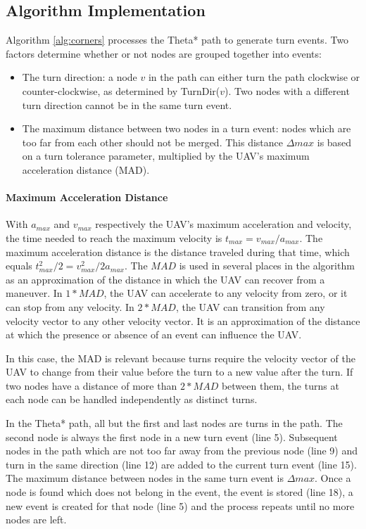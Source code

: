 \subsection{Algorithm Implementation}
Algorithm \ref{alg:corners} processes the Theta* path to generate turn events. Two factors determine whether or not nodes are grouped together into events:
\begin{itemize}
\item The turn direction: a node $v$ in the path can either turn the path clockwise or counter-clockwise, as determined by TurnDir($v$). Two nodes with a different turn direction cannot be in the same turn event.
\item The maximum distance between two nodes in a turn event: nodes which are too far from each other should not be merged. This distance $\Delta max$ is based on a turn tolerance parameter, multiplied by the UAV's maximum acceleration distance (MAD). 
\end{itemize}



\paragraph{Maximum Acceleration Distance}
With $a_{max}$ and $v_{max}$ respectively the UAV's maximum acceleration and velocity, the time needed to reach the maximum velocity is $t_{max} = v_{max} / a_{max}$. The maximum acceleration distance is the distance traveled during that time, which equals $t_{max}^2 / 2 = v_{max}^2 / 2a_{max}$. The $MAD$ is used in several places in the algorithm as an approximation of the distance in which the UAV can recover from a maneuver. In $1*MAD$, the UAV can accelerate to any velocity from zero, or it can stop from any velocity. In $2*MAD$, the UAV can transition from any velocity vector to any other velocity vector. It is an approximation of the distance at which the presence or absence of an event can influence the UAV. 
\par
In this case, the MAD is relevant because turns require the velocity vector of the UAV to change from their value before the turn to a new value after the turn. If two nodes have a distance of more than $2*MAD$ between them, the turns at each node can be handled independently as distinct turns. 
\par
In the Theta* path, all but the first and last nodes are turns in the path. The second node is always the first node in a new turn event (line 5). Subsequent nodes in the path which are not too far away from the previous node (line 9) and turn in the same direction (line 12) are added to the current turn event (line 15). The maximum distance between nodes in the same turn event is $\Delta max$. Once a node is found which does not belong in the event, the event is stored (line 18), a new event is created for that node (line 5) and the process repeats until no more nodes are left.


